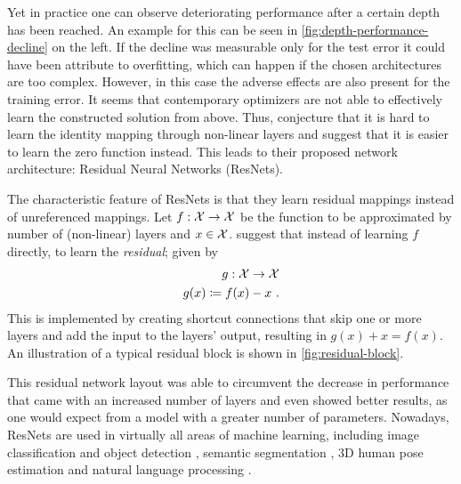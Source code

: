 

Yet in practice one can observe deteriorating performance after a certain depth has been reached.
An example for this can be seen in \cref{fig:depth-performance-decline} on the left.
If the decline was measurable only for the test error it could have been attribute to overfitting, which can happen if the chosen architectures are too complex.
However, in this case the adverse effects are also present for the training error.
It seems that contemporary optimizers are not able to effectively learn the constructed solution from above.
Thus, \citet{he16} conjecture that it is hard to learn the identity mapping through non-linear layers and suggest that it is easier to learn the zero function instead.
This leads to their proposed network architecture: Residual Neural Networks (ResNets).

The characteristic feature of ResNets is that they learn residual mappings instead of unreferenced mappings.
Let $f: \mathcal{X} \rightarrow \mathcal{X}$ be the function to be approximated by number of (non-linear) layers and $x \in \mathcal{X}$.
\citet{he16} suggest that instead of learning $f$ directly, to learn the \emph{residual}; given by
\begin{equation}
	\begin{split}
		g: \mathcal{X} \rightarrow \mathcal{X} \\
		g(x) \coloneqq f(x) - x \ .
	\end{split}
\end{equation}
This is implemented by creating shortcut connections that skip one or more layers and add the input to the layers' output, resulting in $g(x) + x = f(x)$.
An illustration of a typical residual block is shown in \cref{fig:residual-block}.



This residual network layout was able to circumvent the decrease in performance that came with an increased number of layers and even showed better results, as one would expect from a model with a greater number of parameters.
Nowadays, ResNets are used in virtually all areas of machine learning, including image classification and object detection \cite{he16}, semantic segmentation \cite{chen17}, 3D human pose estimation \cite{drover18} and natural language processing \cite{keskar19,conneau16}.
